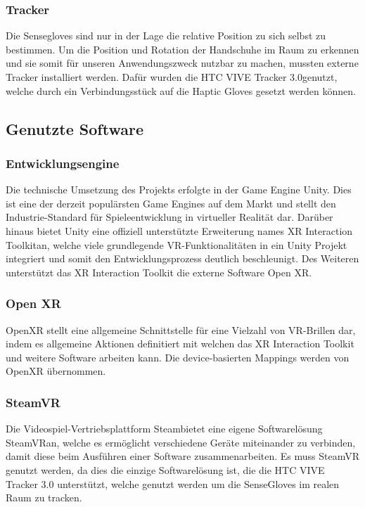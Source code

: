 \subsubsection{Tracker}
Die Sensegloves sind nur in der Lage die relative Position zu sich selbst zu bestimmen. Um die Position und Rotation der Handschuhe im Raum zu erkennen und sie somit für unseren Anwendungszweck nutzbar zu machen, mussten externe Tracker installiert werden. Dafür wurden die \dq HTC VIVE Tracker 3.0\dq genutzt, welche durch ein Verbindungsstück auf die Haptic Gloves gesetzt werden können.

\subsection{Genutzte Software}

\subsubsection{Entwicklungsengine}
Die technische Umsetzung des Projekts erfolgte in der Game Engine \dq Unity\dq. Dies ist eine der derzeit populärsten Game Engines auf dem Markt und stellt den Industrie-Standard für Spieleentwicklung in virtueller Realität dar. Darüber hinaus bietet Unity eine offiziell unterstützte Erweiterung names \dq XR Interaction Toolkit\dq an, welche viele grundlegende VR-Funktionalitäten in ein Unity Projekt integriert und somit den Entwicklungsprozess deutlich beschleunigt. Des Weiteren unterstützt das XR Interaction Toolkit die externe Software \dq Open XR\dq.

\subsubsection{Open XR}
OpenXR stellt eine allgemeine Schnittstelle für eine Vielzahl von VR-Brillen dar, indem es allgemeine Aktionen definitiert mit welchen das XR Interaction Toolkit und weitere Software arbeiten kann. Die device-basierten Mappings werden von OpenXR übernommen.

\subsubsection{SteamVR}
Die Videospiel-Vertriebsplattform \dq Steam\dq bietet eine eigene Softwarelösung \dq SteamVR\dq an, welche es ermöglicht verschiedene Geräte miteinander zu verbinden, damit diese beim Ausführen einer Software zusammenarbeiten. Es muss SteamVR genutzt werden, da dies die einzige Softwarelösung ist, die die HTC VIVE Tracker 3.0 unterstützt, welche genutzt werden um die SenseGloves im realen Raum zu tracken.

